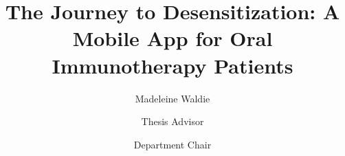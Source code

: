 \documentclass{scu-thesis}
\author{Madeleine Waldie}
\title{The Journey to Desensitization: A Mobile App for Oral Immunotherapy Patients}
\begin{document}
\frontmatter
\signature{Thesis Advisor}
\signature{Department Chair}

\maketitle


\tableofcontents
\listoftables
\listoffigures

\mainmatter








% 
% 
% 




\backmatter
\end{document}
